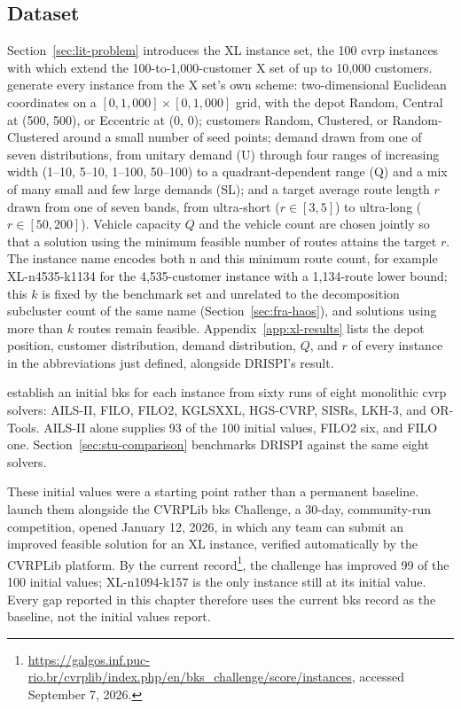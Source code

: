 \subsection{Dataset}\label{sec:stu-dataset}
Section~\ref{sec:lit-problem} introduces the XL instance set, the 100 \gls{cvrp} instances with which \citet{queirogaXLInstancesCapacitated2026} extend the 100-to-1{,}000-customer X set of \citet{uchoaNewBenchmarkInstances2017} up to 10{,}000 customers. \citet{queirogaXLInstancesCapacitated2026} generate every instance from the X set's own scheme: two-dimensional Euclidean coordinates on a $[0,1{,}000]\times[0,1{,}000]$ grid, with the depot Random, Central at (500, 500), or Eccentric at (0, 0); customers Random, Clustered, or Random-Clustered around a small number of seed points; demand drawn from one of seven distributions, from unitary demand (U) through four ranges of increasing width (1--10, 5--10, 1--100, 50--100) to a quadrant-dependent range (Q) and a mix of many small and few large demands (SL); and a target average route length $r$ drawn from one of seven bands, from ultra-short ($r \in [3,5]$) to ultra-long ($r \in [50,200]$). Vehicle capacity $Q$ and the vehicle count are chosen jointly so that a solution using the minimum feasible number of routes attains the target $r$. The instance name encodes both n and this minimum route count, for example XL-n4535-k1134 for the 4,535-customer instance with a 1,134-route lower bound; this $k$ is fixed by the benchmark set and unrelated to the decomposition subcluster count of the same name (Section~\ref{sec:fra-haos}), and solutions using more than $k$ routes remain feasible. Appendix~\ref{app:xl-results} lists the depot position, customer distribution, demand distribution, $Q$, and $r$ of every instance in the abbreviations just defined, alongside DRISPI's result.

\citet{queirogaXLInstancesCapacitated2026} establish an initial \gls{bks} for each instance from sixty runs of eight monolithic \gls{cvrp} solvers: AILS-II, FILO, FILO2, KGLSXXL, HGS-CVRP, SISRs, LKH-3, and OR-Tools. AILS-II alone supplies 93 of the 100 initial values, FILO2 six, and FILO one. Section~\ref{sec:stu-comparison} benchmarks DRISPI against the same eight solvers.

These initial values were a starting point rather than a permanent baseline. \citet{queirogaXLInstancesCapacitated2026} launch them alongside the CVRPLib \gls{bks} Challenge, a 30-day, community-run competition, opened January 12, 2026, in which any team can submit an improved feasible solution for an XL instance, verified automatically by the CVRPLib platform. By the current record\footnote{\url{https://galgos.inf.puc-rio.br/cvrplib/index.php/en/bks_challenge/score/instances}, accessed September 7, 2026.}, the challenge has improved 99 of the 100 initial values; XL-n1094-k157 is the only instance still at its initial value. Every gap reported in this chapter therefore uses the current \gls{bks} record as the baseline, not the initial values \citet{queirogaXLInstancesCapacitated2026} report.


